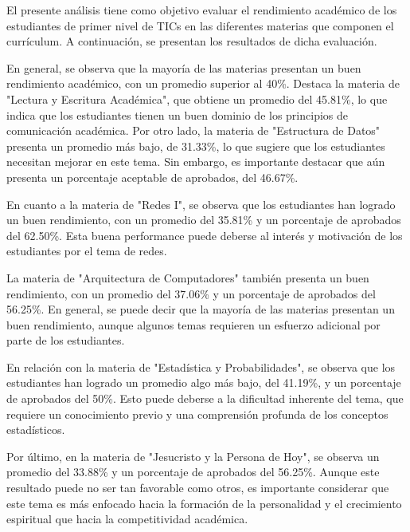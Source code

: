 El presente análisis tiene como objetivo evaluar el rendimiento académico de los estudiantes de primer nivel de TICs en las diferentes materias que componen el currículum. A continuación, se presentan los resultados de dicha evaluación.

En general, se observa que la mayoría de las materias presentan un buen rendimiento académico, con un promedio superior al 40\%. Destaca la materia de "Lectura y Escritura Académica", que obtiene un promedio del 45.81\%, lo que indica que los estudiantes tienen un buen dominio de los principios de comunicación académica. Por otro lado, la materia de "Estructura de Datos" presenta un promedio más bajo, de 31.33\%, lo que sugiere que los estudiantes necesitan mejorar en este tema. Sin embargo, es importante destacar que aún presenta un porcentaje aceptable de aprobados, del 46.67\%.

En cuanto a la materia de "Redes I", se observa que los estudiantes han logrado un buen rendimiento, con un promedio del 35.81\% y un porcentaje de aprobados del 62.50\%. Esta buena performance puede deberse al interés y motivación de los estudiantes por el tema de redes.

La materia de "Arquitectura de Computadores" también presenta un buen rendimiento, con un promedio del 37.06\% y un porcentaje de aprobados del 56.25\%. En general, se puede decir que la mayoría de las materias presentan un buen rendimiento, aunque algunos temas requieren un esfuerzo adicional por parte de los estudiantes.

En relación con la materia de "Estadística y Probabilidades", se observa que los estudiantes han logrado un promedio algo más bajo, del 41.19\%, y un porcentaje de aprobados del 50\%. Esto puede deberse a la dificultad inherente del tema, que requiere un conocimiento previo y una comprensión profunda de los conceptos estadísticos.

Por último, en la materia de "Jesucristo y la Persona de Hoy", se observa un promedio del 33.88\% y un porcentaje de aprobados del 56.25\%. Aunque este resultado puede no ser tan favorable como otros, es importante considerar que este tema es más enfocado hacia la formación de la personalidad y el crecimiento espiritual que hacia la competitividad académica.

